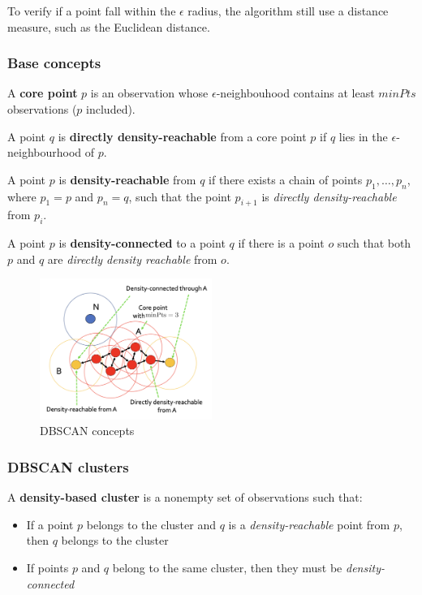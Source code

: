 To verify if a point fall within the $\epsilon$ radius, the algorithm still use a distance measure, such as the Euclidean distance.

\subsubsection*{Base concepts}
A \textbf{core point} $p$ is an observation whose $\epsilon$-neighbouhood contains at least $minPts$ observations ($p$ included).

A point $q$ is \textbf{directly density-reachable} from a core point $p$ if $q$ lies in the $\epsilon$-neighbourhood of $p$.

A point $p$ is \textbf{density-reachable} from $q$ if there exists a chain of points $p_1,\dots,p_n$, where $p_1=p$ and $p_n=q$, such that the point $p_{i+1}$ is \textit{directly density-reachable} from $p_i$.

A point $p$ is \textbf{density-connected} to a point $q$ if there is a point $o$ such that both $p$ and $q$ are \textit{directly density reachable} from $o$.

\begin{figure}
    \centering
    \includegraphics[width=0.5\textwidth]{./figures/chapter_7/dbscanconcepts.png}
    \caption{DBSCAN concepts}
    \label{fig:dbscan}
\end{figure}

\subsubsection*{DBSCAN clusters}
A \textbf{density-based cluster} is a nonempty set of observations such that:

\begin{itemize}
    \item If a point $p$ belongs to the cluster and $q$ is a \textit{density-reachable} point from $p$, then $q$ belongs to the cluster
    \item If points $p$ and $q$ belong to the same cluster, then they must be \textit{density-connected}
\end{itemize}

